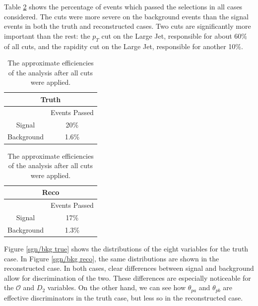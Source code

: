 \documentclass[10pt,a4paper]{book}
\begin{document}
Table \ref{Efficiencies table} shows the percentage of events which passed the selections in all cases considered. The cuts were more severe on the background events than the signal events in both the truth and reconstructed cases. Two cuts are significantly more important than the rest: the $p_T$ cut on the Large Jet, responsible for about 60\% of all cuts, and the rapidity cut on the Large Jet, responsible for another 10\%.

\begin{table}[!htb]
    \begin{minipage}{.5\linewidth}
      \centering
        \begin{tabular}{|c|c|}
		\hline 
		\multicolumn{2}{|c|}{\textbf{Truth}} \\ 
		\hline 
		\* & Events Passed \\ 
		\hline 
		Signal & 20\% \\ 
		\hline 
		Background & 1.6\% \\ 
		\hline 
		\end{tabular}  
    \end{minipage}%
    \begin{minipage}{.5\linewidth}
      \centering
        \begin{tabular}{|c|c|}
		\hline 
		\multicolumn{2}{|c|}{\textbf{Reco}} \\ 
		\hline 
		\* & Events Passed \\ 
		\hline 
		Signal & 17\% \\ 
		\hline 
		Background & 1.3\% \\ 
		\hline 
		\end{tabular} 
    \end{minipage} 
    \caption{The approximate efficiencies of the analysis after all cuts were applied.}
    \label{Efficiencies table}
\end{table}

Figure \ref{sgn/bkg true} shows the distributions of the eight variables for the truth case. In Figure \ref{sgn/bkg reco}, the same distributions are shown in the reconstructed case. In both cases, clear differences between signal and background allow for discrimination of the two. These differences are especially noticeable for the $\mathcal{O}$ and $D_2$ variables. On the other hand, we can see how $\theta_{pa}$ and $\theta_{pb}$ are effective discriminators in the truth case, but less so in the reconstructed case.
\end{document}

